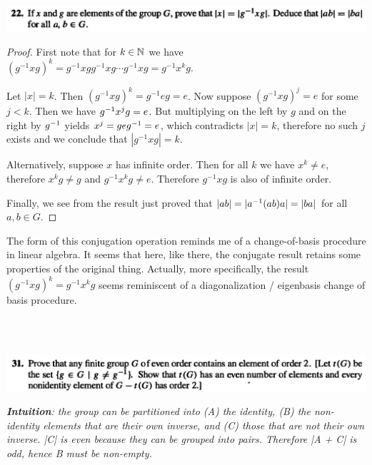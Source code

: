 ~\\~\\
\begin{mdframed}
\includegraphics[width=400pt]{img/algebra--nf--1--problem-set-1-5058.png}
\end{mdframed}
\begin{proof}
  First note that for $k \in \mathbb{N}$ we have $(g^{-1}xg)^k = g^{-1}xgg^{-1}xg \cdots g^{-1}xg = g^{-1}x^kg$.

  Let $|x| = k$. Then $(g^{-1}xg)^k = g^{-1}eg = e$. Now suppose $(g^{-1}xg)^j = e$ for
  some $j < k$. Then we have $g^{-1}x^jg = e$. But multiplying on the left by $g$ and on the right
  by $g^{-1}$ yields $x^j = geg^{-1} = e$, which contradicts $|x| = k$, therefore no such $j$ exists
  and we conclude that $|g^{-1}xg| = k$.


  Alternatively, suppose $x$ has infinite order. Then for all $k$ we have $x^k \neq e$,
  therefore $x^kg \neq g$ and $g^{-1}x^kg \neq e$. Therefore $g^{-1}xg$ is also of infinite order.


  Finally, we see from the result just proved that $|ab| = |a^{-1}(ab)a| = |ba|$ for all $a,b \in G$.
\end{proof}

\begin{remark*}
  The form of this conjugation operation reminds me of a change-of-basis procedure in linear
  algebra. It seems that here, like there, the conjugate result retains some properties of the
  original thing. Actually, more specifically, the result $(g^{-1}xg)^k = g^{-1}x^kg$ seems
  reminiscent of a diagonalization / eigenbasis change of basis procedure.
\end{remark*}


~\\~\\
\begin{mdframed}
\includegraphics[width=400pt]{img/algebra--nf--1--problem-set-1-ca16.png}
\end{mdframed}

{\it {\bf Intuition}: the group can be partitioned into (A) the identity, (B) the non-identity elements
  that are their own inverse, and (C) those that are not their own inverse. |C| is even because
  they can be grouped into pairs. Therefore |A + C| is odd, hence B must be non-empty.}



